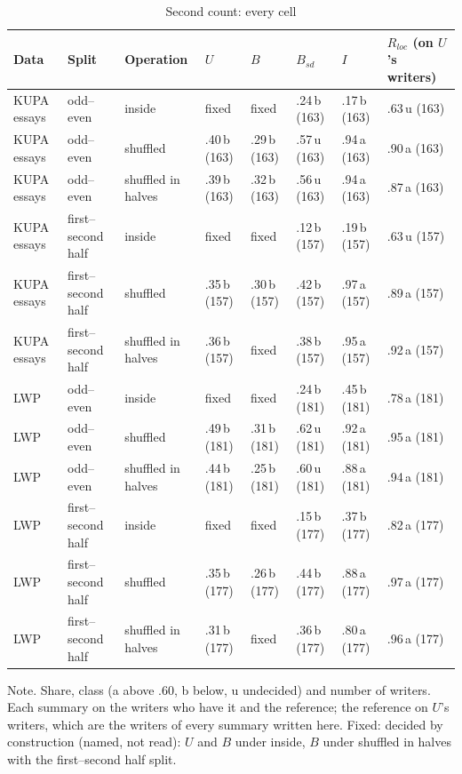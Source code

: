 \begin{table}[htbp]
\caption{Second count: every cell}
\label{tab:cellsm}
\scriptsize
\begin{tabularx}{\linewidth}{@{}lllXXXXX@{}}
\toprule
Data & Split & Operation & $U$ & $B$ & $B_{sd}$ & $I$ & $R_{loc}$ (on $U$'s writers) \\
\midrule
KUPA essays & odd--even & inside & fixed & fixed & .24\,b (163) & .17\,b (163) & .63\,u (163) \\
KUPA essays & odd--even & shuffled & .40\,b (163) & .29\,b (163) & .57\,u (163) & .94\,a (163) & .90\,a (163) \\
KUPA essays & odd--even & shuffled in halves & .39\,b (163) & .32\,b (163) & .56\,u (163) & .94\,a (163) & .87\,a (163) \\
KUPA essays & first--second half & inside & fixed & fixed & .12\,b (157) & .19\,b (157) & .63\,u (157) \\
KUPA essays & first--second half & shuffled & .35\,b (157) & .30\,b (157) & .42\,b (157) & .97\,a (157) & .89\,a (157) \\
KUPA essays & first--second half & shuffled in halves & .36\,b (157) & fixed & .38\,b (157) & .95\,a (157) & .92\,a (157) \\
LWP & odd--even & inside & fixed & fixed & .24\,b (181) & .45\,b (181) & .78\,a (181) \\
LWP & odd--even & shuffled & .49\,b (181) & .31\,b (181) & .62\,u (181) & .92\,a (181) & .95\,a (181) \\
LWP & odd--even & shuffled in halves & .44\,b (181) & .25\,b (181) & .60\,u (181) & .88\,a (181) & .94\,a (181) \\
LWP & first--second half & inside & fixed & fixed & .15\,b (177) & .37\,b (177) & .82\,a (177) \\
LWP & first--second half & shuffled & .35\,b (177) & .26\,b (177) & .44\,b (177) & .88\,a (177) & .97\,a (177) \\
LWP & first--second half & shuffled in halves & .31\,b (177) & fixed & .36\,b (177) & .80\,a (177) & .96\,a (177) \\
\bottomrule
\end{tabularx}
\par\smallskip\footnotesize Note. Share, class (a above .60, b below, u undecided) and number of writers. Each summary on the writers who have it and the reference; the reference on $U$'s writers, which are the writers of every summary written here. Fixed: decided by construction (named, not read): $U$ and $B$ under inside, $B$ under shuffled in halves with the first--second half split.
\end{table}
